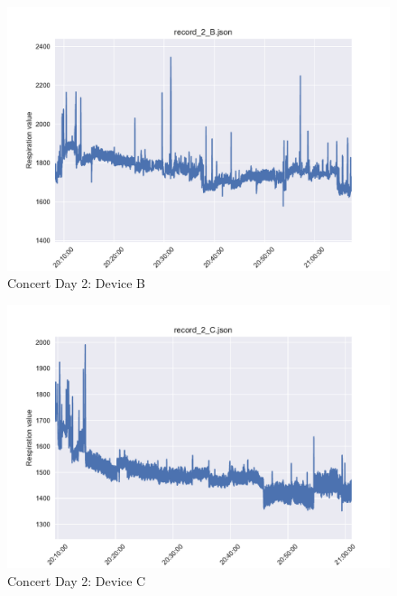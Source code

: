 \begin{figure}
    \centering
    \includegraphics[scale=0.6]{images/record_2_b.pdf}
    \caption{Concert Day 2: Device B}
    \label{fig:concert_day2_b}
\end{figure}

\begin{figure}
    \centering
    \includegraphics[scale=0.6]{images/record_2_c.pdf}
    \caption{Concert Day 2: Device C}
    \label{fig:concert_day2_c}
\end{figure}

